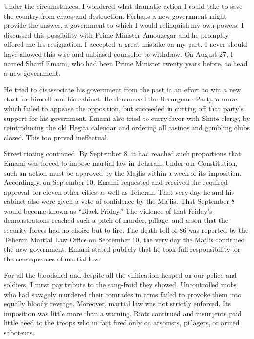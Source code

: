 Under the circumstances, I wondered what dramatic action I could take to save the country from chaos and destruction. Perhaps a new government might provide the answer, a government to which I would relinquish my own powers. I discussed this possibility with Prime Minister Amouzegar and he promptly offered me his resignation. I accepted--a great mistake on my part. I never should have allowed this wise and unbiased counselor to withdraw. On August 27, I named Sharif Emami, who had been Prime Minister twenty years before, to head a new government. 

He tried to disassociate his government from the past in an effort to win a new start for himself and his cabinet. He denounced the Resurgence Party, a move which failed to appease the opposition, but succeeded in cutting off that party's support for his government. Emami also tried to curry favor with Shiite clergy, by reintroducing the old Hegira calendar and ordering all casinos and gambling clubs closed. This too proved ineffectual. 

Street rioting continued. By September 8, it had reached such proportions that Emami was forced to impose martial law in Teheran. Under our Constitution, such an action must be approved by the Majlis within a week of its imposition. Accordingly, on September 10, Emami requested and received the required approval--for eleven other cities as well as Teheran. That very day he and his cabinet also were given a vote of confidence by the Majlis. That September 8 would become known as “Black Friday.” The violence of that Friday’s demonstrations reached such a pitch of murder, pillage, and arson that the security forces had no choice but to fire. The death toll of 86 was reported by the Teheran Martial Law Office on September 10, the very day the Majlis confirmed the new government. Emami stated publicly that he took full responsibility for the consequences of martial law. 

For all the bloodshed and despite all the vilification heaped on our police and soldiers, I must pay tribute to the sang-froid they showed. Uncontrolled mobs who had savagely murdered their comrades in arms failed to provoke them into equally bloody revenge. Moreover, martial law was not strictly enforced. Its imposition was little more than a warning. Riots continued and insurgents paid little heed to the troops who in fact fired only on arsonists, pillagers, or armed saboteurs. 

